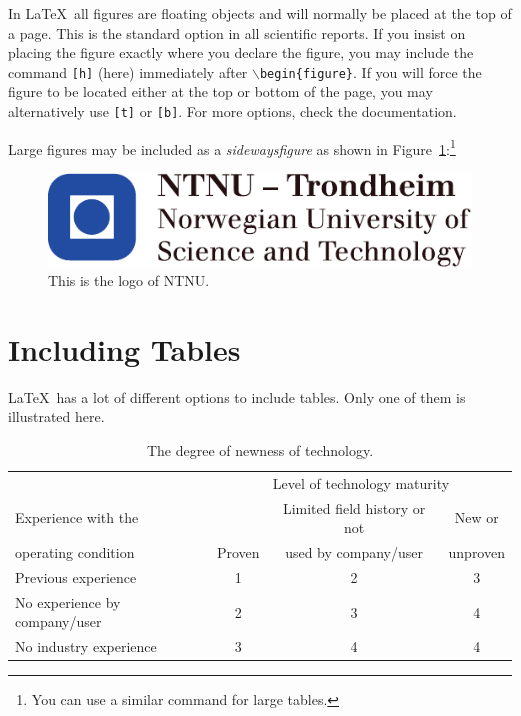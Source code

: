 In \LaTeX\ all figures are floating objects and will normally be placed at the top of a page. This is the standard option in all scientific reports. If you insist on placing the figure exactly where you declare the figure, you may include the command \texttt{[h]} (here) immediately after $\backslash$\texttt{begin\{figure\}}. If you will force the figure to be located either at the top or bottom of the page, you may alternatively use  \texttt{[t]} or \texttt{[b]}. For more options, check the documentation.

Large figures may be included as a \emph{sidewaysfigure} as shown in Figure~\ref{fig2}:\footnote{You can use a similar command for large tables.}
\begin{figure}
\centering
\includegraphics[scale=1.8]{fig/NTNU}
\caption{This is the logo of NTNU.}
\label{fig2}
\end{figure}

\section{Including Tables}
\LaTeX\ has a lot of different options to include tables. Only one of them is illustrated here.

\begin{table}
	\centering\small
	\caption{The degree of newness of technology.}
	\label{tab1}
		\begin{tabular*}{\textwidth}{@{\extracolsep{\fill}}lccc}
			\toprule
			  &\multicolumn{3}{c}{Level of technology maturity}\\
  \cmidrule{2-4}
			Experience with the		   &  & Limited field history or not & New or \\
              operating  condition  & Proven &  used by company/user & unproven \\
        
			\midrule
			  Previous experience & 1 & 2 & 3 \\
		          No experience by company/user & 2 & 3 & 4 \\
		          No industry experience & 3 & 4 & 4 \\
			\bottomrule
		\end{tabular*}
\end{table}

